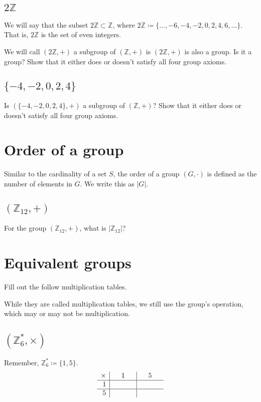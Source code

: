 		\subsection{$2\mathbb{Z}$}
			We will say that the subset $2\mathbb{Z} \subset \mathbb{Z}$, where $2\mathbb{Z} \coloneqq \{\dots, -6, -4, -2, 0, 2, 4, 6, \dots\}$. That is, $2\mathbb{Z}$ is the set of even integers.

			We will call $(2\mathbb{Z}, +)$ a subgroup of $(\mathbb{Z}, +)$ is $(2\mathbb{Z}, +)$ is also a group. Is it a group? Show that it either does or doesn't satisfy all four group axioms.
		\subsection{$\{-4, -2, 0, 2, 4\}$}
			Is $(\{-4, -2, 0, 2, 4\}, +)$ a subgroup of $(\mathbb{Z}, +)$? Show that it either does or doesn't satisfy all four group axioms.
	\newpage
	\section{Order of a group}
		Similar to the cardinality of a set $S$, the order of a group $(G, \cdot)$ is defined as the number of elements in $G$. We write this as $|G|$.

		\subsection{$(\mathbb{Z}_{12}, +)$}
			For the group $(\mathbb{Z}_{12}, +)$, what is $|\mathbb{Z}_{12}|$?
	\section{Equivalent groups}
		Fill out the follow multiplication tables.

		While they are called multiplication tables, we still use the group's operation, which may or may not be multiplication.
		\subsection{$(\mathbb{Z}_6^*, \times)$}
			Remember, $\mathbb{Z}_6^* \coloneqq \{1, 5\}$.
			\begin{equation*}
				\begin{array}{r|c|c}
					\times & \mathmakebox[1cm]{1} & \mathmakebox[1cm]{5}\\\hline
					1      &                      &                     \\\hline
					5      &                      &
				\end{array}
			\end{equation*}
